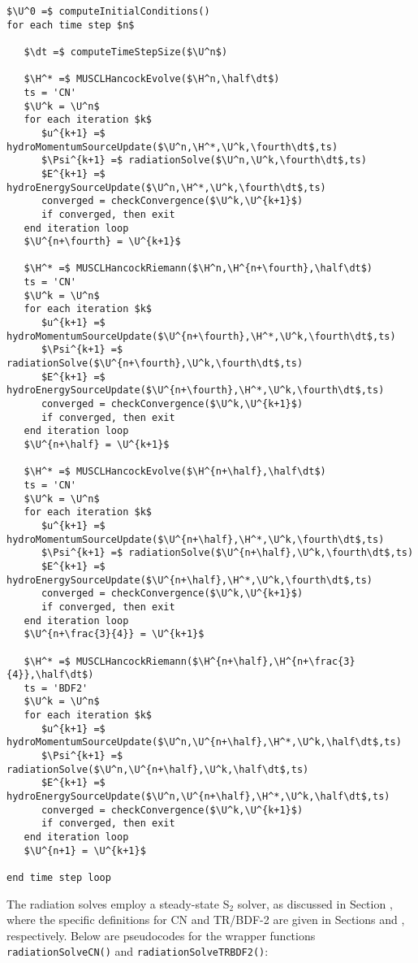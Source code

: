 \begin{lstlisting}[mathescape,columns=fullflexible,
   basicstyle=\fontfamily{lmvtt}\selectfont]
$\U^0 =$ computeInitialConditions()
for each time step $n$

   $\dt =$ computeTimeStepSize($\U^n$)

   $\H^* =$ MUSCLHancockEvolve($\H^n,\half\dt$)
   ts = 'CN'
   $\U^k = \U^n$
   for each iteration $k$
      $u^{k+1} =$ hydroMomentumSourceUpdate($\U^n,\H^*,\U^k,\fourth\dt$,ts)
      $\Psi^{k+1} =$ radiationSolve($\U^n,\U^k,\fourth\dt$,ts)
      $E^{k+1} =$ hydroEnergySourceUpdate($\U^n,\H^*,\U^k,\fourth\dt$,ts)
      converged = checkConvergence($\U^k,\U^{k+1}$)
      if converged, then exit
   end iteration loop
   $\U^{n+\fourth} = \U^{k+1}$

   $\H^* =$ MUSCLHancockRiemann($\H^n,\H^{n+\fourth},\half\dt$)
   ts = 'CN'
   $\U^k = \U^n$
   for each iteration $k$
      $u^{k+1} =$ hydroMomentumSourceUpdate($\U^{n+\fourth},\H^*,\U^k,\fourth\dt$,ts)
      $\Psi^{k+1} =$ radiationSolve($\U^{n+\fourth},\U^k,\fourth\dt$,ts)
      $E^{k+1} =$ hydroEnergySourceUpdate($\U^{n+\fourth},\H^*,\U^k,\fourth\dt$,ts)
      converged = checkConvergence($\U^k,\U^{k+1}$)
      if converged, then exit
   end iteration loop
   $\U^{n+\half} = \U^{k+1}$

   $\H^* =$ MUSCLHancockEvolve($\H^{n+\half},\half\dt$)
   ts = 'CN'
   $\U^k = \U^n$
   for each iteration $k$
      $u^{k+1} =$ hydroMomentumSourceUpdate($\U^{n+\half},\H^*,\U^k,\fourth\dt$,ts)
      $\Psi^{k+1} =$ radiationSolve($\U^{n+\half},\U^k,\fourth\dt$,ts)
      $E^{k+1} =$ hydroEnergySourceUpdate($\U^{n+\half},\H^*,\U^k,\fourth\dt$,ts)
      converged = checkConvergence($\U^k,\U^{k+1}$)
      if converged, then exit
   end iteration loop
   $\U^{n+\frac{3}{4}} = \U^{k+1}$

   $\H^* =$ MUSCLHancockRiemann($\H^{n+\half},\H^{n+\frac{3}{4}},\half\dt$)
   ts = 'BDF2'
   $\U^k = \U^n$
   for each iteration $k$
      $u^{k+1} =$ hydroMomentumSourceUpdate($\U^n,\U^{n+\half},\H^*,\U^k,\half\dt$,ts)
      $\Psi^{k+1} =$ radiationSolve($\U^n,\U^{n+\half},\U^k,\half\dt$,ts)
      $E^{k+1} =$ hydroEnergySourceUpdate($\U^n,\U^{n+\half},\H^*,\U^k,\half\dt$,ts)
      converged = checkConvergence($\U^k,\U^{k+1}$)
      if converged, then exit
   end iteration loop
   $\U^{n+1} = \U^{k+1}$

end time step loop
\end{lstlisting}

The radiation solves employ a steady-state S$_2$ solver, as discussed
in Section , where the specific definitions for
CN and TR/BDF-2 are given in Sections  and ,
respectively. Below are pseudocodes for the wrapper functions
\texttt{radiationSolveCN()} and \texttt{radiationSolveTRBDF2()}:

